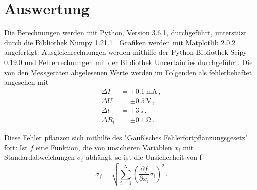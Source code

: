 \section{Auswertung}
\label{sec:Auswertung}
Die Berechnungen werden mit Python, Version 3.6.1, durchgeführt, unterstüzt durch die Bibliothek Numpy 1.21.1 \cite{numpy}. Grafiken werden mit Matplotlib 2.0.2 \cite{matplotlib} angefertigt.
Ausgleichrechnungen werden mithilfe der Python-Bibliothek Scipy 0.19.0 \cite{scipy}
und Fehlerrechnungen mit der Bibliothek Uncertainties \cite{uncertainties} durchgeführt.
Die von den Messgeräten abgelesenen Werte werden im Folgenden als fehlerbehaftet angesehen mit
\begin{align*}
  \Delta I &= \pm \SI{0.1}{\milli\ampere}\,, \\
  \Delta U &= \pm \SI{0.5}{\volt}\,, \\
  \Delta t &= \pm \SI{3}{\second}\,, \\
  \Delta R_i &= \pm \SI{0.1}{\ohm}\,.
\end{align*}

Diese Fehler pflanzen sich mithilfe des "Gauß'sches Fehlerfortpflanzungsgesetz" fort:
Ist $f$ eine Funktion, die von unsicheren Variablen $x_i$ mit
Standardabweichungen $\sigma_i$ abhängt, so ist die Unsicherheit von f
\begin{equation*}
  \sigma_f = \sqrt{
    \sum\limits_{i = 1}^N
      \left( \frac{\partial f}{\partial x_i} \sigma_i \right)^{\!\! 2}
  }\,.
  \label{eqn:gaussfehler}
\end{equation*}

